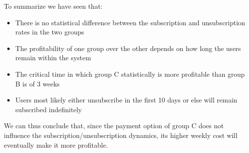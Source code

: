 \documentclass[paper=a4, fontsize=11pt]{report}
\begin{document}
\normalsize
To summarize we have seen that:
\begin{itemize}
 \item There is no statistical difference between the subscription and unsubscription rates in the two groups
 \item The profitability of one group over the other depends on how long the users remain within the system
 \item The critical time in which group C statistically is more profitable than group B is of 3 weeks
 \item Users most likely either unsubscribe in the first 10 days or else will remain subscribed indefinitely
\end{itemize}

We can thus conclude that, since the payment option of group C does not influence the subscription/unsubscription dynamics, its
higher weekly cost will eventually make it more profitable.
\end{document}
